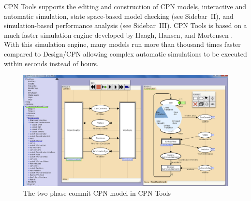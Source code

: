 CPN Tools supports the editing and construction of CPN models,
interactive and automatic simulation, state space-based model checking
(see Sidebar~II), and simulation-based performance analysis (see
Sidebar~III). CPN Tools is based on a much faster simulation engine
developed by Haagh, Hansen, and Mortensen \cite{mortensen:01}. With
this simulation engine, many models run more than thousand times
faster compared to Design/CPN allowing complex automatic simulations
to be executed within seconds instead of hours. 


\begin{figure}[t]
\centering
\includegraphics[scale=.37]{figures/cpntools.png}
\caption{The two-phase commit CPN model in CPN Tools}
\label{fig:cpntools}
\end{figure}

